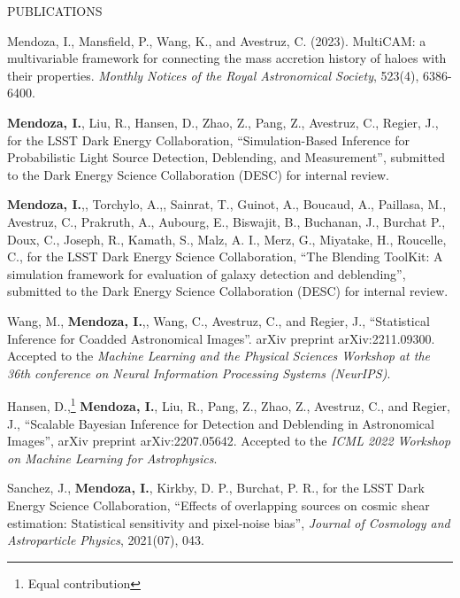 \documentclass{resume} %
\begin{document}
\begin{rSection}{PUBLICATIONS}
%
\vspace*{-1em}

\item Mendoza, I., Mansfield, P., Wang, K., and Avestruz, C. (2023). MultiCAM: a multivariable framework for connecting the mass accretion history of haloes with their properties. \textit{Monthly Notices of the Royal Astronomical Society}, 523(4), 6386-6400.

\item \textbf{Mendoza, I.}, Liu, R., Hansen, D., Zhao, Z., Pang, Z., Avestruz, C., Regier, J., for the LSST Dark Energy Collaboration, ``Simulation-Based Inference for Probabilistic Light Source Detection, Deblending, and Measurement'', submitted to the Dark Energy Science Collaboration (DESC) for internal review.

\item \textbf{Mendoza, I.},, Torchylo, A.,, Sainrat, T., Guinot, A., Boucaud, A., Paillasa, M., Avestruz, C., Prakruth, A., Aubourg, E., Biswajit, B., Buchanan, J., Burchat P., Doux, C., Joseph, R., Kamath, S., Malz, A. I., Merz, G., Miyatake, H., Roucelle, C., for the LSST Dark Energy Science Collaboration, ``The Blending ToolKit: A simulation framework for evaluation of galaxy detection and deblending'', submitted to the Dark Energy Science Collaboration (DESC) for internal review.

\item Wang, M., \textbf{Mendoza, I.},, Wang, C., Avestruz, C., and Regier, J., ``Statistical Inference for Coadded Astronomical Images''. arXiv preprint arXiv:2211.09300. Accepted to the \textit{Machine Learning and the Physical Sciences Workshop at the 36th conference on Neural Information Processing Systems (NeurIPS)}.

\item Hansen, D.,\footnote[1]{\label{ft:equal} Equal contribution} \textbf{Mendoza, I.}, Liu, R., Pang, Z., Zhao, Z., Avestruz, C., and Regier, J., ``Scalable Bayesian Inference for Detection and Deblending in Astronomical Images'', arXiv preprint arXiv:2207.05642. Accepted to the \textit{ICML 2022 Workshop on Machine Learning for Astrophysics}.

\item Sanchez, J., \textbf{Mendoza, I.}, Kirkby, D. P., Burchat, P. R., for the LSST Dark Energy Science Collaboration, “Effects of overlapping sources on cosmic shear estimation: Statistical sensitivity and pixel-noise bias”, \textit{Journal of Cosmology and Astroparticle Physics}, 2021(07), 043.

\end{rSection}
\end{document}

